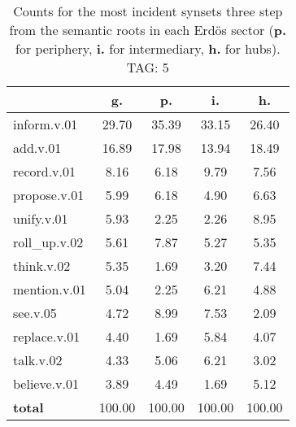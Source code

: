 \begin{table}[h!]
\begin{center}
\begin{tabular}{| l | c | c | c | c |}\hline
 & g. & p. & i. & h. \\\hline
inform.v.01 & 29.70  & 35.39  & 33.15  & 26.40 \\\hline
add.v.01 & 16.89  & 17.98  & 13.94  & 18.49 \\\hline
record.v.01 & 8.16  & 6.18  & 9.79  & 7.56 \\\hline
propose.v.01 & 5.99  & 6.18  & 4.90  & 6.63 \\\hline
unify.v.01 & 5.93  & 2.25  & 2.26  & 8.95 \\\hline
roll\_up.v.02 & 5.61  & 7.87  & 5.27  & 5.35 \\\hline
think.v.02 & 5.35  & 1.69  & 3.20  & 7.44 \\\hline
mention.v.01 & 5.04  & 2.25  & 6.21  & 4.88 \\\hline
see.v.05 & 4.72  & 8.99  & 7.53  & 2.09 \\\hline
replace.v.01 & 4.40  & 1.69  & 5.84  & 4.07 \\\hline
talk.v.02 & 4.33  & 5.06  & 6.21  & 3.02 \\\hline
believe.v.01 & 3.89  & 4.49  & 1.69  & 5.12 \\\hline
{{\bf total}} & 100.00  & 100.00  & 100.00  & 100.00 \\\hline
\end{tabular}
\caption{Counts for the most incident synsets three step from the semantic roots in each Erd\"os sector ({\bf p.} for periphery, {\bf i.} for intermediary, {\bf h.} for hubs). TAG: 5}
\end{center}
\end{table}